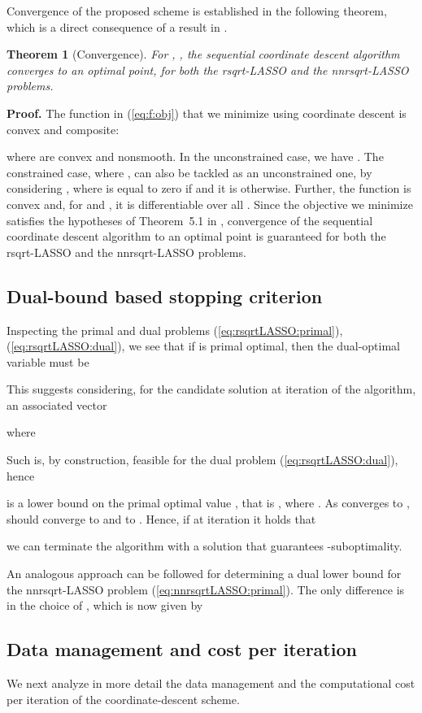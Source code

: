 \documentclass[11pt]{article}
\newcommand{\qed}{{\hfill }}
\newtheorem{theorem}{Theorem}
\begin{document}
Convergence of the proposed scheme is established in the following theorem, which is a
direct consequence of a result in \cite{Tseng:01}.

\begin{theorem}[Convergence]
For , ,  the sequential coordinate descent algorithm converges
to an optimal point,
for both the rsqrt-LASSO and the nnrsqrt-LASSO problems.
\end{theorem}

\noindent
{\bf Proof.}
	The function  in (\ref{eq:f:obj}) that we minimize using coordinate descent is convex and composite:
	
	where  are convex and nonsmooth. 
	In the unconstrained case, we have . The constrained case, where , can  also be tackled as an unconstrained one, by considering
	, where  is equal to zero if
	 and it is  otherwise. 	
	Further, the function  is convex and, for  and , 
	it is differentiable over all .
	Since the objective we minimize satisfies the hypotheses of
	Theorem~5.1 in \cite{Tseng:01}, convergence 
	of the sequential coordinate descent algorithm to an optimal point
	 is guaranteed for both the rsqrt-LASSO and the nnrsqrt-LASSO problems.
	  \qed


\subsection{Dual-bound based stopping criterion}
\label{sec:dualbound}
Inspecting the primal and dual problems (\ref{eq:rsqrtLASSO:primal}), (\ref{eq:rsqrtLASSO:dual}), we see that if
 is primal optimal, then the dual-optimal variable  must be

This suggests considering,
for the candidate solution  at iteration  of the algorithm,  an associated vector

where

Such  is, by construction, feasible for the dual problem  (\ref{eq:rsqrtLASSO:dual}), hence 

is a lower bound on the primal optimal value , that is ,
where .
As  converges to ,  should converge to  and  to .
Hence, if at iteration  it holds that

we can terminate the algorithm with a solution  that guarantees -suboptimality.

An analogous approach can be followed for determining a dual lower bound for the 
nnrsqrt-LASSO problem (\ref{eq:nnrsqrtLASSO:primal}). The only difference is in the choice of , which is now given by


\subsection{Data management and cost per iteration}
\label{sec:cd-iterate}
We next analyze in more detail 
the data management and
the computational cost per iteration of the coordinate-descent scheme.
\end{document}
